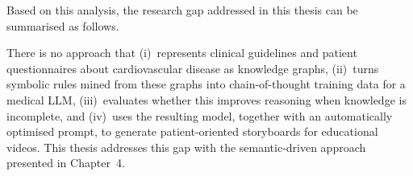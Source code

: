 Based on this analysis, the research gap addressed in this thesis can be
summarised as follows.

\begin{rwgap}
There is no approach that (i)~represents clinical guidelines and patient
questionnaires about cardiovascular disease as knowledge graphs,
(ii)~turns symbolic rules mined from these graphs into chain-of-thought
training data for a medical LLM, (iii)~evaluates whether this improves
reasoning when knowledge is incomplete, and (iv)~uses the resulting model,
together with an automatically optimised prompt, to generate
patient-oriented storyboards for educational videos. This thesis addresses
this gap with the semantic-driven approach presented in
Chapter~4.
\end{rwgap}
